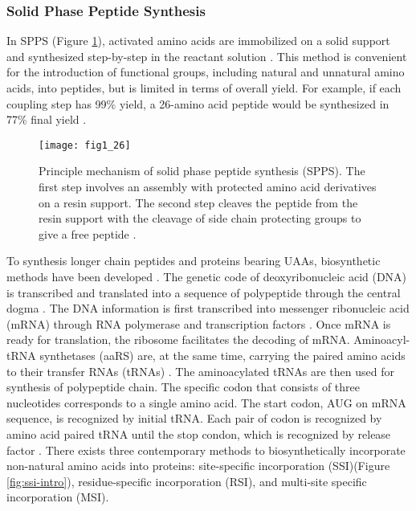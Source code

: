 \begin{refsection}
\subsubsection{Solid Phase Peptide Synthesis}
In SPPS  (Figure \ref{fig:spps-intro}), activated amino acids are
immobilized on a solid support and synthesized step-by-step in the reactant
solution \cite{Merrifield1963a}. This method is convenient for the introduction
of functional groups, including natural and unnatural amino acids, into
peptides, but is limited in terms of overall yield. For example, if each
coupling step has 99\% yield, a 26-amino acid peptide would be synthesized in
77\% final yield \cite{Chan2000}.  
\begin{figure}[h!] \centering \texttt{[image: fig1\_26]}
    \caption[Principle mechanism of solid phase peptide synthesis (SPPS). The
    first step involves an assembly with protected amino acid derivatives on a
resin support. The second step cleaves the peptide from the resin support with
the cleavage of side chain protecting groups to give a free peptide.]{Principle
    mechanism of solid phase peptide synthesis (SPPS). The first step involves
    an assembly with protected amino acid derivatives on a resin support. The
    second step cleaves the peptide from the resin support with the cleavage of
    side chain protecting groups to give a free peptide
    \cite{Merrifield1963a,Mahto2011}.} 
    \label{fig:spps-intro} 
\end{figure}

To synthesis longer chain peptides and proteins bearing UAAs, biosynthetic
methods have been developed
\cite{Voloshchuk2007b,Yoo2007,Johnson2010,Link2003,Voloshchuk2010,Montclare2006b}.
The genetic code of deoxyribonucleic acid (DNA) is transcribed and translated
into a sequence of polypeptide through the central dogma \cite{CRICK1970}. The
DNA information is first transcribed into messenger ribonucleic acid (mRNA)
through RNA polymerase and transcription factors \cite{Pukkila2001}. Once mRNA
is ready for translation, the ribosome facilitates the decoding of mRNA.
Aminoacyl-tRNA synthetases (aaRS) are, at the same time, carrying the paired
amino acids to their transfer RNAs (tRNAs) \cite{Pukkila2001}. The
aminoacylated tRNAs are then used for synthesis of polypeptide chain. The
specific codon that consists of three nucleotides corresponds to a single amino
acid. The start codon, AUG on mRNA sequence, is recognized by initial tRNA.
Each pair of codon is recognized by amino acid paired tRNA \cite{Sadava2006}
until the stop condon, which is recognized by release factor
\cite{Pukkila2001}. There exists three contemporary methods to biosynthetically
incorporate non-natural amino acids into proteins: site-specific incorporation
(SSI)(Figure \ref{fig:ssi-intro}), residue-specific incorporation (RSI), and
multi-site specific incorporation (MSI). 


\end{refsection}
